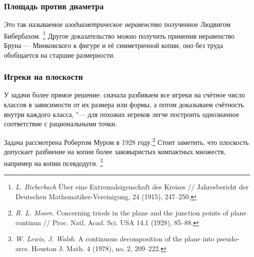 \documentclass[twoside]{book}
\begin{document}
\subsubsection{Площадь против диаметра}
Это так называемое \emph{изодиаметрическое неравенство} полученное Людвигом Бибербахом.
\footnote{\emph{L. Bieberbach} Über eine Extremaleigenschaft des Kreises /\!/ {Jahresbericht der Deutschen Mathematiker-Vereinigung}, 24 (1915), 247--250.}
Другое доказательство можно получить применив неравенство Бруна — Минковского к фигуре и её симметричной
копии, оно без труда обобщается на старшие размерности.

\subsubsection{Игреки на плоскости}
У задачи более прямое решение: сначала разбиваем все игреки на счётное число классов в зависимости от их размера или формы, 
а потом доказываем счётность внутри каждого класса, "--- для похожих игреков легче построить однозначное соответствие с рациональными точки.

Задача рассмотрена Робертом Муром в 1928 году.\footnote{\emph{R. L. Moore}. Concerning triods in the plane and the junction points of plane continua /\!/ {Proc. Natl. Acad. Sci. USA} 14.1 (1928), 85--88.}
Стоит заметить, что плоскость допускает разбиение на копии более заковыристых компактных множеств, например на копии псевдодуги.%
\footnote{\emph{W. Lewis, J. Walsh}. 
A continuous decomposition of the plane into pseudo-arcs.
Houston J. Math. 4 (1978), no. 2, 209--222.} 

{
\small

\printindex

}

{

\sloppy

\printbibliography[title={Дополнительная литература},heading=bibintoc]


\fussy

}

\newpage

{

\tableofcontents

}
\end{document}
